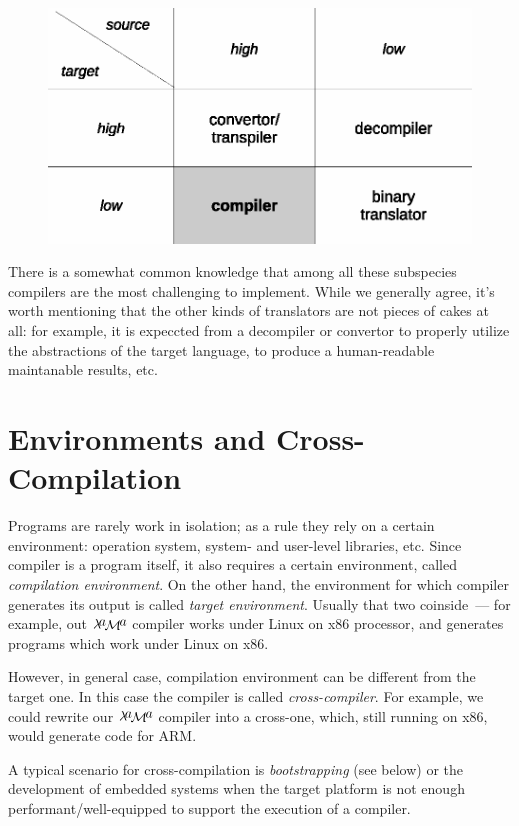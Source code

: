 \documentclass{article}
\newcommand{\lama}{$\lambda\kern -.1667em\lower -.5ex\hbox{$a$}\kern -.1000em\lower .2ex\hbox{$\mathcal M$}\kern -.1000em\lower -.5ex\hbox{$a$}$\xspace}
\begin{document}
\begin{figure}[h]
  \centering
  \includegraphics[scale=0.7]{images/01-05.eps}
\end{figure}

There is a somewhat common knowledge that among all these subspecies compilers are the most challenging to implement. While
we generally agree, it's worth mentioning that the other kinds of translators are not pieces of cakes at all: for example,
it is expeccted from a decompiler or convertor to properly utilize the abstractions of the target language, to produce a
human-readable maintanable results, etc.

\section{Environments and Cross-Compilation}

Programs are rarely work in isolation; as a rule they rely on a certain environment: operation system, system- and user-level
libraries, etc. Since compiler is a program itself, it also requires a certain environment, called \emph{compilation environment}.
On the other hand, the environment for which compiler generates its output is called \emph{target environment}. Usually that two
coinside~--- for example, out \lama compiler works under Linux on x86 processor, and generates programs which work
under Linux on x86.

However, in general case, compilation environment can be different from the target one. In this case the compiler is called
\emph{cross-compiler}. For example, we could rewrite our \lama compiler into a cross-one, which, still running on x86,
would generate code for ARM. 

A typical scenario for cross-compilation is \emph{bootstrapping} (see below) or the development of embedded systems when
the target platform is not enough performant/well-equipped to support the execution of a compiler.
\end{document}
